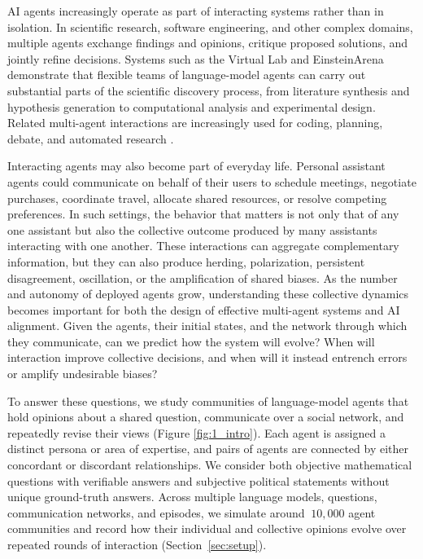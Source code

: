 AI agents increasingly operate as part of interacting systems rather than in isolation. In scientific research, software engineering, and other complex domains, multiple agents exchange findings and opinions, critique proposed solutions, and jointly refine decisions. Systems such as the Virtual Lab \citep{Swanson2024.11.11.623004} and EinsteinArena \citep{bianchi2026harnessingcollectiveintelligenceai} demonstrate that flexible teams of language-model agents can carry out substantial parts of the scientific discovery process, from literature synthesis and hypothesis generation to computational analysis and experimental design. Related multi-agent interactions are increasingly used for coding, planning, debate, and automated research \citep{du2023improvingfactualityreasoninglanguage,liang-etal-2024-encouraging,chen2023}.

Interacting agents may also become part of everyday life. Personal assistant agents could communicate on behalf of their users to schedule meetings, negotiate purchases, coordinate travel, allocate shared resources, or resolve competing preferences. In such settings, the behavior that matters is not only that of any one assistant but also the collective outcome produced by many assistants interacting with one another. These interactions can aggregate complementary information, but they can also produce herding, polarization, persistent disagreement, oscillation, or the amplification of shared biases. As the number and autonomy of deployed agents grow, understanding these collective dynamics becomes important for both the design of effective multi-agent systems and AI alignment. Given the agents, their initial states, and the network through which they communicate, can we predict how the system will evolve? When will interaction improve collective decisions, and when will it instead entrench errors or amplify undesirable biases?




To answer these questions, we study communities of language-model agents that hold opinions about a shared question, communicate over a social network, and repeatedly revise their views (Figure \ref{fig:1_intro}). Each agent is assigned a distinct persona or area of expertise, and pairs of agents are connected by either concordant or discordant relationships. We consider both objective mathematical questions with verifiable answers and subjective political statements without unique ground-truth answers. Across multiple language models, questions, communication networks, and episodes, we simulate around $~10,000$ agent communities and record how their individual and collective opinions evolve over repeated rounds of interaction (Section~\ref{sec:setup}).

